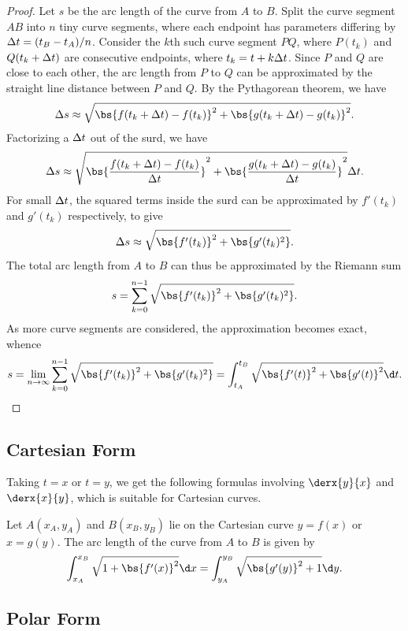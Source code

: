 \begin{proof}
    Let $s$ be the arc length of the curve from $A$ to $B$. Split the curve segment $AB$ into $n$ tiny curve segments, where each endpoint has parameters differing by $\Delta t = (t_B - t_A)/n$. Consider the $k$th such curve segment $PQ$, where $P(t_k)$ and $Q(t_k + \Delta t)$ are consecutive endpoints, where $t_k = t + k \Delta t$. Since $P$ and $Q$ are close to each other, the arc length from $P$ to $Q$ can be approximated by the straight line distance between $P$ and $Q$. By the Pythagorean theorem, we have \[\D s \approx \sqrt{\bs{f(t_k + \D t) - f(t_k)}^2 + \bs{g(t_k + \D t) - g(t_k)}^2}.\] Factorizing a $\Delta t$ out of the surd, we have \[\D s \approx \sqrt{\bs{\frac{f(t_k + \D t) - f(t_k)}{\D t}}^2 + \bs{\frac{g(t_k + \D t) - g(t_k)}{\D t}}^2} \D t.\] For small $\Delta t$, the squared terms inside the surd can be approximated by $f'(t_k)$ and $g'(t_k)$ respectively, to give \[\D s \approx \sqrt{\bs{f'(t_k)}^2 + \bs{g'(t_k)^2}}.\] The total arc length from $A$ to $B$ can thus be approximated by the Riemann sum \[s = \sum_{k = 0}^{n-1} \sqrt{\bs{f'(t_k)}^2 + \bs{g'(t_k)^2}}.\] As more curve segments are considered, the approximation becomes exact, whence \[s = \lim_{n \to \infty} \sum_{k = 0}^{n-1} \sqrt{\bs{f'(t_k)}^2 + \bs{g'(t_k)^2}} = \int_{t_A}^{t_B} \sqrt{\bs{f'(t)}^2 + \bs{g'(t)}^2} \d t.\]
\end{proof}

\subsection{Cartesian Form}

Taking $t = x$ or $t = y$, we get the following formulas involving $\derx{y}{x}$ and $\derx{x}{y}$, which is suitable for Cartesian curves.

\begin{proposition}
    Let $A(x_A, y_A)$ and $B(x_B, y_B)$ lie on the Cartesian curve $y = f(x)$ or $x = g(y)$. The arc length of the curve from $A$ to $B$ is given by \[\int_{x_A}^{x_B} \sqrt{1 + \bs{f'(x)}^2} \d x = \int_{y_A}^{y_B} \sqrt{\bs{g'(y)}^2 + 1} \d y.\]
\end{proposition}

\subsection{Polar Form}

